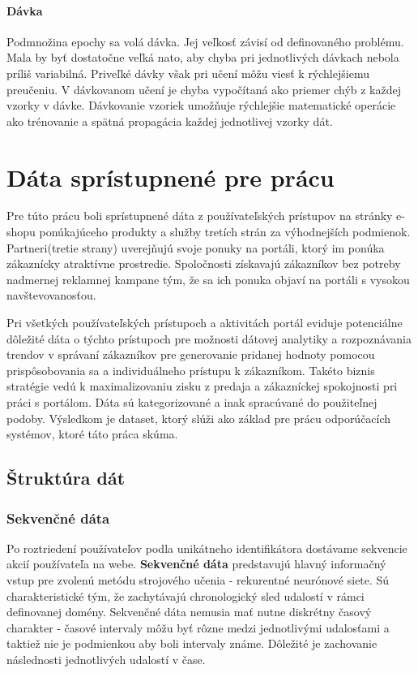 \subsubsection*{Dávka}

Podmnožina epochy sa volá dávka. Jej veľkosť závisí od definovaného problému. Mala by byť dostatočne veľká nato, aby chyba pri jednotlivých dávkach nebola príliš variabilná. Priveľké dávky však pri učení môžu viesť k rýchlejšiemu preučeniu. V dávkovanom učení je chyba vypočítaná ako priemer chýb z každej vzorky v dávke. Dávkovanie vzoriek umožňuje rýchlejšie matematické operácie ako trénovanie a spätná propagácia každej jednotlivej vzorky dát.


\chapter{Dáta sprístupnené pre prácu}
\label{analyza_data}

Pre túto prácu boli sprístupnené dáta z používateľských prístupov na stránky e-shopu ponúkajúceho produkty a služby tretích strán za výhodnejších podmienok. Partneri(tretie strany) uverejňujú svoje ponuky na portáli, ktorý im ponúka zákaznícky atraktívne prostredie. Spoločnosti získavajú zákazníkov bez potreby nadmernej reklamnej kampane tým, že sa ich ponuka objaví na portáli s vysokou navštevovanosťou.

Pri všetkých používateľských prístupoch a aktivitách portál eviduje potenciálne dôležité dáta o týchto prístupoch pre možnosti dátovej analytiky a rozpoznávania trendov v správaní zákazníkov pre generovanie pridanej hodnoty pomocou prispôsobovania sa a individuálneho prístupu k zákazníkom. Takéto biznis stratégie vedú k maximalizovaniu zisku z predaja a zákazníckej spokojnosti pri práci s portálom. Dáta sú kategorizované a inak spracúvané do použiteľnej podoby. Výsledkom je dataset, ktorý slúži ako základ pre prácu odporúčacích systémov, ktoré táto práca skúma.

\section{Štruktúra dát}


\subsection{Sekvenčné dáta}

Po roztriedení používateľov podla unikátneho identifikátora dostávame sekvencie akcií používateľa na webe. \textbf{Sekvenčné dáta} predstavujú hlavný informačný vstup pre zvolenú metódu strojového učenia - rekurentné neurónové siete. Sú charakteristické tým, že zachytávajú chronologický sled udalostí v rámci definovanej domény. Sekvenčné dáta nemusia mať nutne diskrétny časový charakter - časové intervaly môžu byť rôzne medzi jednotlivými udalosťami a taktiež nie je podmienkou aby boli intervaly známe. Dôležité je zachovanie následnosti jednotlivých udalostí v čase.

